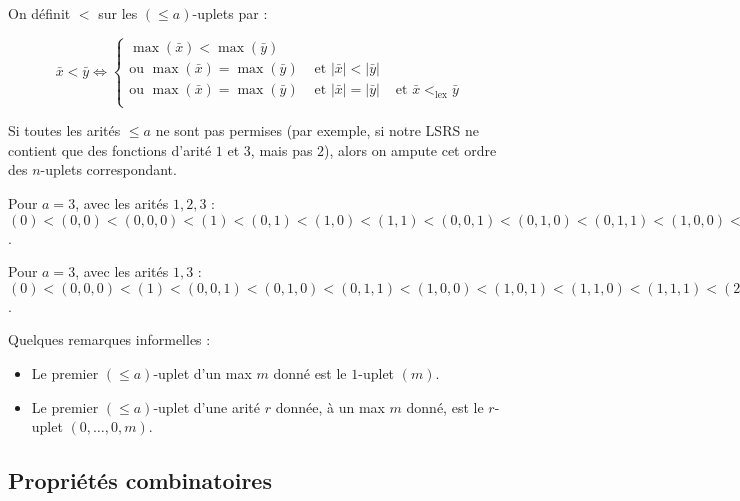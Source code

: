 \documentclass{report}
\newcommand{\leqa}{\left( \leqslant a \right)}
\begin{document}
		\begin{definition}
			\label{def:bon_ordre_sur_uplets}
			On définit $<$ sur les $\leqa$-uplets par :
			
			\[
				\bar{x} < \bar{y} \Leftrightarrow \left\lbrace
														\begin{array}{ccc}
															\max\left(\bar{x}\right) < \max\left(\bar{y}\right) & & \\
															\text{ou } \max\left(\bar{x}\right) = \max\left(\bar{y}\right) & 
																\text{ et } \left|\bar{x}\right| < \left|\bar{y}\right| & \\
															\text{ou } \max\left(\bar{x}\right) = \max\left(\bar{y}\right) & 
																\text{ et } \left|\bar{x}\right| = \left|\bar{y}\right| & 
																\text{ et } \bar{x} <_{\text{lex}} \bar{y}\\
														\end{array}
													\right. 
			\]
			
			Si toutes les arités $\leqslant a$ ne sont pas permises (par exemple, si notre LSRS ne contient que des fonctions d'arité $1$ et $3$, mais pas $2$), alors on ampute cet ordre des $n$-uplets correspondant.
		\end{definition}
	
	
		\begin{example}
			Pour $a = 3$, avec les arités $1,2,3$ : $(0) < (0, 0) < (0,0,0) < (1) < (0,1) < (1,0) < (1,1) < (0,0,1) < (0,1,0) < (0,1,1) < (1,0,0) < (1,0,1) < (1,1,0) < (1,1,1) < (2) < (0,2) < \dots$.
			
			Pour $a = 3$, avec les arités $1,3$ : $(0) < (0,0,0) < (1) < (0,0,1) < (0,1,0) < (0,1,1) < (1,0,0) < (1,0,1) < (1,1,0) < (1,1,1) < (2) < (0,0,2) <\dots$.
		\end{example}
		
		\begin{remark}
			Quelques remarques informelles : 
			\begin{itemize}
				\item 	Le premier $\leqa$-uplet d'un max $m$ donné est le $1$-uplet $\left( m \right)$.
				\item 	Le premier $\leqa$-uplet d'une arité $r$ donnée, à un max $m$ donné, est le $r$-uplet $\left( 0, \dots, 0, m\right)$. 
			\end{itemize}
		\end{remark}
		
		
		
		\subsection{Propriétés combinatoires}
		\label{subsec:bon_ordre_prop_combinatoires}
		
\end{document}
